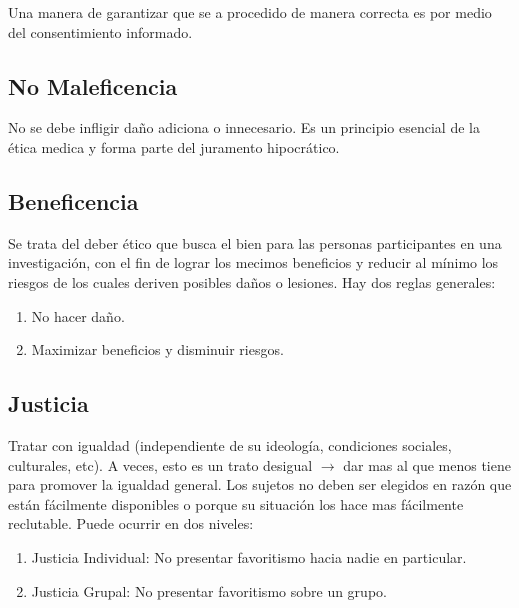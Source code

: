     Una manera de garantizar que se a procedido de manera correcta es por medio del consentimiento informado.
    \subsection*{No Maleficencia}

    No se debe infligir daño adiciona o innecesario. Es un principio esencial de la ética medica y forma parte del juramento hipocrático.

    \subsection*{Beneficencia}

    Se trata del deber ético que busca el bien para las personas participantes en una investigación, con el fin de lograr los mecimos beneficios y reducir al mínimo los riesgos de los cuales deriven posibles daños o lesiones. Hay dos reglas generales:
    \begin{enumerate}
      \item No hacer daño.
      \item Maximizar beneficios y disminuir riesgos.
    \end{enumerate}
    \subsection*{Justicia}
    Tratar con igualdad (independiente de su ideología, condiciones sociales, culturales, etc). A veces, esto es un trato desigual $\to $ dar mas al que menos tiene para promover la igualdad general. Los sujetos no deben ser elegidos en razón que están fácilmente disponibles o porque su situación los hace mas fácilmente reclutable. Puede ocurrir en dos niveles: 
    \begin{enumerate}
      \item Justicia Individual: No presentar favoritismo hacia nadie en particular.
      \item Justicia Grupal: No presentar favoritismo sobre un grupo.
    \end{enumerate}


